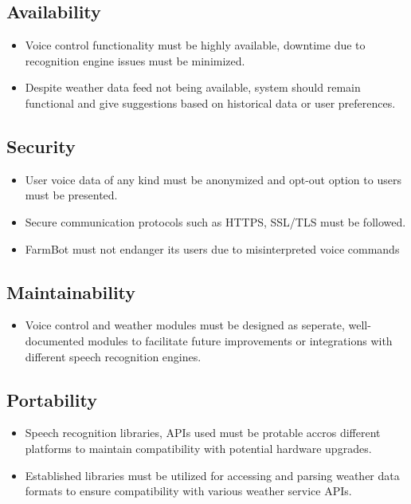\subsection{Availability}
\begin{itemize}
    \item Voice control functionality must be highly available, downtime due to recognition engine issues must be minimized.
    \item Despite weather data feed not being available, system should remain functional and give suggestions based on historical data or user preferences.
\end{itemize}

\subsection{Security}
\begin{itemize}
    \item User voice data of any kind must be anonymized and opt-out option to users must be presented.
    \item Secure communication protocols such as HTTPS, SSL/TLS must be followed.
    \item FarmBot must not endanger its users due to misinterpreted voice commands
\end{itemize}

\subsection{Maintainability}
\begin{itemize}
    \item Voice control and weather modules must be designed as seperate, well-documented modules to facilitate future improvements or integrations with different speech recognition engines.
\end{itemize}

\subsection{Portability}
\begin{itemize}
    \item Speech recognition libraries, APIs used must be protable accros different platforms to maintain compatibility with potential hardware upgrades.
    \item Established libraries must be utilized for accessing and parsing weather data formats to ensure compatibility with various weather service APIs.
\end{itemize}

